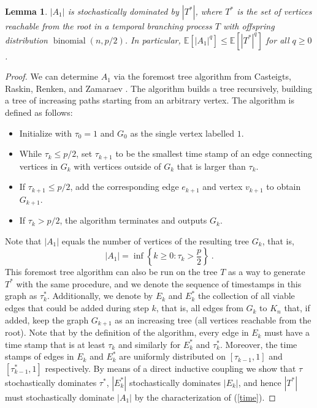 \documentclass[11pt]{article}
\newtheorem{lemma}[theorem]{Lemma}
\newcommand{\1}{\mathbf{1}} %
\newcommand{\ex}{\mathbb{E}} %
\newcommand{\bin}{\ensuremath{\operatorname{binomial}}} %
\begin{document}
\begin{lemma}\label{stoch}
$|A_1|$ is stochastically dominated by $|T^*|$, where $T^*$ is the set of vertices reachable from the root in a temporal branching process $T$ with offspring distribution $\bin(n,p/2)$. In particular, $\ex[|A_1|^q] \leq \ex[|T^*|^q]$ for all $q \geq 0$.
\end{lemma}

\begin{proof}
We can determine $A_1$ via the foremost tree algorithm from
Casteigts, Raskin, Renken, and Zamaraev \cite{Casteigts2023}.
  The algorithm builds a tree recursively, building a tree of
  increasing
  paths starting from an arbitrary
  vertex. The algorithm is defined  as follows:

\begin{itemize}
\item
    Initialize with $\tau_0 = 1$ and $G_0$ as the single vertex
    labelled $1$.
 \item
  While $\tau_k \leq p/2$, set $\tau_{k+1}$ to be the smallest time
stamp of an edge   connecting vertices in $G_k$ with vertices outside of $G_k$
that is
larger than $\tau_k$.
\item
  If $\tau_{k+1} \leq p/2$, add the corresponding edge $e_{k+1}$ and
vertex $v_{k+1}$ to obtain $G_{k+1}$.
\item
    If $\tau_k>p/2$, the algorithm terminates and outputs
$G_{k}$.
\end{itemize}

Note that $|A_1|$
  equals the number of vertices of the resulting tree $G_k$,
that is,
\begin{equation}\label{time}
|A_1| = \inf\left\{k \geq 0 : \tau_k > \frac{p}{2}\right\}~.
\end{equation}
This foremost tree algorithm can also be run on the tree $T$ as a way
to generate $T^*$ with the same procedure, and we denote the sequence
of timestamps in this graph as $\tau^*_k$. Additionally, we denote by
$E_k$ and $E^*_k$ the collection of all viable edges that could be
added during step $k$, that is, all edges from $G_k$ to $K_n$ that, if added, keep the graph $G_{k+1}$ as an increasing tree (all vertices reachable from the root). Note that by the definition of the algorithm, every edge in $E_k$ must have a time stamp that is at least $\tau_k$ and similarly for $E_k^*$ and $\tau^*_k$. Moreover, the time stamps of edges in $E_k$ and $E^*_k$ are uniformly distributed on $[\tau_{k-1},1]$ and $[\tau_{k-1}^*,1]$ respectively. By means of a direct inductive coupling we show that $\tau$ stochastically dominates $\tau^*$, $|E_k^*|$ stochastically dominates $|E_k|$, and hence $|T^*|$ must stochastically dominate $|A_1|$ by the characterization of (\ref{time}).


\end{proof}
\end{document}
